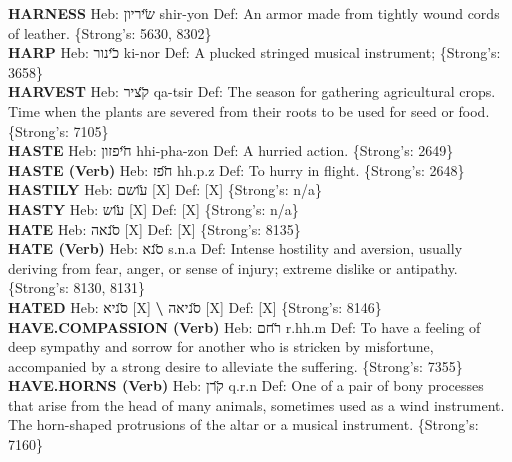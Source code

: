{\textbf{HARNESS} Heb: {\large\H שיריון} shir-yon Def: An armor made from tightly wound cords of leather. \{Strong's: 5630, 8302\}\hfill{}\\

\textbf{HARP} Heb: {\large\H כינור} ki-nor Def: A plucked stringed musical instrument; \{Strong's: 3658\}\hfill{}\\

\textbf{HARVEST} Heb: {\large\H קציר} qa-tsir Def: The season for gathering agricultural crops. Time when the plants are severed from their roots to be used for seed or food. \{Strong's: 7105\}\hfill{}\\

\textbf{HASTE} Heb: {\large\H חיפזון} hhi-pha-zon Def: A hurried action. \{Strong's: 2649\}\hfill{}\\

\textbf{HASTE (Verb)} Heb: {\large\H חפז} hh.p.z Def: To hurry in flight. \{Strong's: 2648\}\hfill{}\\

\textbf{HASTILY} Heb: {\large\H עושם} {[}X{]} Def: {[}X{]} \{Strong's: n/a\}\hfill{}\\

\textbf{HASTY} Heb: {\large\H עוש} {[}X{]} Def: {[}X{]} \{Strong's: n/a\}\hfill{}\\

\textbf{HATE} Heb: {\large\H סנאה} {[}X{]} Def: {[}X{]} \{Strong's: 8135\}\hfill{}\\

\textbf{HATE (Verb)} Heb: {\large\H סנא} s.n.a Def: Intense hostility and aversion, usually deriving from fear, anger, or sense of injury; extreme dislike or antipathy. \{Strong's: 8130, 8131\}\hfill{}\\

\textbf{HATED} Heb: {\large\H סניא} {[}X{]} \textbf{\textbackslash{}} {\large\H סניאה} {[}X{]} Def: {[}X{]} \{Strong's: 8146\}\hfill{}\\

\textbf{HAVE.COMPASSION (Verb)} Heb: {\large\H רחם} r.hh.m Def: To have a feeling of deep sympathy and sorrow for another who is stricken by misfortune, accompanied by a strong desire to alleviate the suffering. \{Strong's: 7355\}\hfill{}\\

\textbf{HAVE.HORNS (Verb)} Heb: {\large\H קרן} q.r.n Def: One of a pair of bony processes that arise from the head of many animals, sometimes used as a wind instrument. The horn-shaped protrusions of the altar or a musical instrument. \{Strong's: 7160\}\hfill{}\\

}
